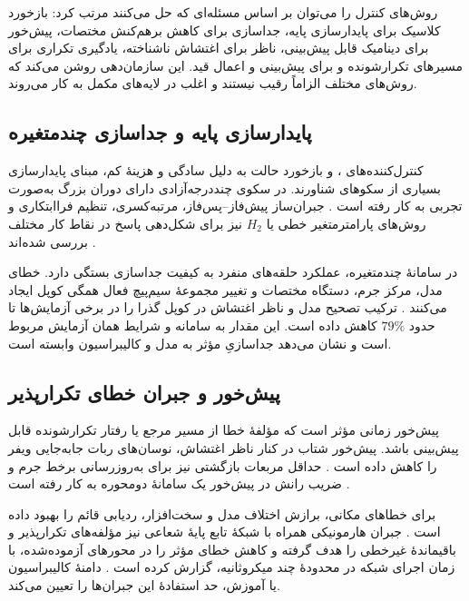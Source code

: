 روش‌های کنترل را می‌توان بر اساس مسئله‌ای که حل می‌کنند مرتب کرد: بازخورد کلاسیک برای پایدارسازی پایه، جداسازی برای کاهش برهم‌کنش مختصات، پیش‌خور برای دینامیک قابل پیش‌بینی، ناظر برای اغتشاش ناشناخته، یادگیری تکراری برای مسیرهای تکرارشونده و  برای پیش‌بینی و اعمال قید. این سازمان‌دهی روشن می‌کند که روش‌های مختلف الزاماً رقیب نیستند و اغلب در لایه‌های مکمل به کار می‌روند.

\subsection{پایدارسازی پایه و جداسازی چندمتغیره}
\label{subsec:feedback-decoupling-control}

کنترل‌کننده‌های ،  و بازخورد حالت به دلیل سادگی و هزینهٔ کم، مبنای پایدارسازی بسیاری از سکوهای شناورند.  در سکوی چنددرجه‌آزادی دارای دوران بزرگ به‌صورت تجربی به کار رفته است \cite{miyasakaMagneticLevitationUnlimited2014}. جبران‌ساز پیش‌فاز--پس‌فاز،  مرتبه‌کسری، تنظیم فراابتکاری و روش‌های پارامترمتغیر خطی یا $H_2$ نیز برای شکل‌دهی پاسخ در نقاط کار مختلف بررسی شده‌اند \cite{zhangDecouplingLevitationControl2012,wangCharacteristicAnalysisDisplacement2025,bizunehPerformanceAnalysisOptimized2024,maUnbalanceCompensationMethod2024,leePerformanceEnhancementUsing2026}.

در سامانهٔ چندمتغیره، عملکرد حلقه‌های منفرد به کیفیت جداسازی بستگی دارد. خطای مدل، مرکز جرم، دستگاه مختصات و تغییر مجموعهٔ سیم‌پیچ فعال همگی کوپل ایجاد می‌کنند \cite{cmmCommutationMagneticallyLevitated2008}. ترکیب تصحیح مدل و ناظر اغتشاش در \cite{chenEnhancedDecouplingStrategy2025} کوپل گذرا را در برخی آزمایش‌ها تا حدود \(79\%\) کاهش داده است. این مقدار به سامانه و شرایط همان آزمایش مربوط است و نشان می‌دهد جداسازیِ مؤثر به مدل و کالیبراسیون وابسته است.

\subsection{پیش‌خور و جبران خطای تکرارپذیر}
\label{subsec:feedforward-repetitive-compensation}

پیش‌خور زمانی مؤثر است که مؤلفهٔ خطا از مسیر مرجع یا رفتار تکرارشونده قابل پیش‌بینی باشد. پیش‌خور شتاب در کنار ناظر اغتشاش، نوسان‌های ربات جابه‌جایی ویفر را کاهش داده است \cite{haRobustAirgapStabilization2026}. حداقل مربعات بازگشتی نیز برای به‌روزرسانی برخط جرم و ضریب رانش در پیش‌خور یک سامانهٔ دومحوره به کار رفته است \cite{liuAdaptiveFeedforwardControl2024}.

برای خطاهای مکانی، برازش اختلاف مدل  و سخت‌افزار، ردیابی قائم را بهبود داده است \cite{nakataCompensationFEMBased2026}. جبران هارمونیکی همراه با شبکهٔ تابع پایهٔ شعاعی نیز مؤلفه‌های تکرارپذیر و باقیماندهٔ غیرخطی را هدف گرفته و کاهش خطای مؤثر را در محورهای آزموده‌شده، با زمان اجرای شبکه در محدودهٔ چند میکروثانیه، گزارش کرده است \cite{liuHybridHarmonicRBFNNBased2025}. دامنهٔ کالیبراسیون یا آموزش، حد استفادهٔ این جبران‌ها را تعیین می‌کند.

